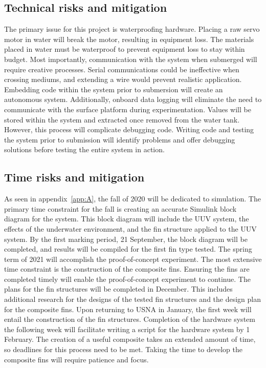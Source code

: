 \documentclass{IEEEtran}
\begin{document}
\subsection{Technical risks and mitigation}
The primary issue for this project is waterproofing hardware.  Placing a raw servo motor in water will break the motor, resulting in equipment loss.  The materials placed in water must be waterproof to prevent equipment loss to stay within budget.  Most importantly, communication with the system when submerged will require creative processes.  Serial communications could be ineffective when crossing mediums, and extending a wire would prevent realistic application.  Embedding code within the system prior to submersion will create an autonomous system.  Additionally, onboard data logging will eliminate the need to communicate with the surface platform during experimentation.  Values will be stored within the system and extracted once removed from the water tank.  However, this process will complicate debugging code.  Writing code and testing the system prior to submission will identify problems and offer debugging solutions before testing the entire system in action.  

\subsection{Time risks and mitigation}
As seen in appendix~\ref{app:A}, the fall of 2020 will be dedicated to simulation.  The primary time constraint for the fall is creating an accurate Simulink block diagram for the system.  This block diagram will include the UUV system, the effects of the underwater environment, and the fin structure applied to the UUV system.  By the first marking period, 21 September, the block diagram will be completed, and results will be compiled for the first fin type tested.  The spring term of 2021 will accomplish the proof-of-concept experiment.  The most extensive time constraint is the construction of the composite fins.  Ensuring the fins are completed timely will enable the proof-of-concept experiment to continue.  The plans for the fin structures will be completed in December.  This includes additional research for the designs of the tested fin structures and the design plan for the composite fins.  Upon returning to USNA in January, the first week will entail the construction of the fin structures.  Completion of the hardware system the following week will facilitate writing a script for the hardware system by 1 February.  The creation of a useful composite takes an extended amount of time, so deadlines for this process need to be met.  Taking the time to develop the composite fins will require patience and focus.  
\end{document}
